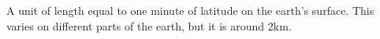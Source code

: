 A unit of length equal to one minute of latitude on the earth's surface.
This varies on different parts of the earth, but it is around 2km.